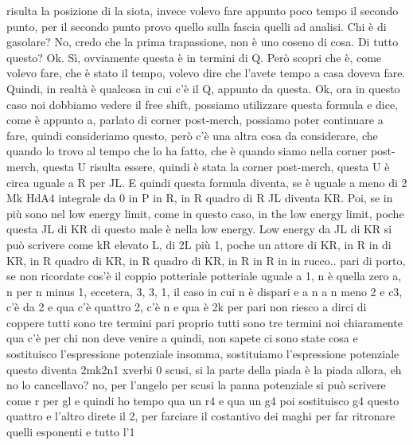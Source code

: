 \begin{soluzione}
risulta la posizione di la siota, invece volevo fare appunto poco tempo il secondo punto, per il secondo punto provo quello sulla fascia quelli ad analisi. Chi è di gasolare? No, credo che la prima trapassione, non è uno coseno di cosa. Di tutto questo? Ok. Sì, ovviamente questa è in termini di Q. Però scopri che è, come volevo fare, che è stato il tempo, volevo dire che l'avete tempo a casa doveva fare. Quindi, in realtà è qualcosa in cui c'è il Q, appunto da questa. Ok, ora in questo caso noi dobbiamo vedere il free shift, possiamo utilizzare questa formula e dice, come è appunto a, parlato di corner post-merch, possiamo poter continuare a fare, quindi consideriamo questo, però c'è una altra cosa da considerare, che quando lo trovo al tempo che lo ha fatto, che è quando siamo nella corner post-merch, questa U risulta essere, quindi è stata la corner post-merch, questa U è circa uguale a R per JL. E quindi questa formula diventa, se è uguale a meno di 2 Mk HdA4 integrale da 0 in P in R, in R quadro di R JL diventa KR. Poi, se in più sono nel low energy limit, come in questo caso, in the low energy limit, poche questa JL di KR di questo male è nella low energy. Low energy da JL di KR si può scrivere come kR elevato L, di 2L più 1, poche un attore di KR, in R in di KR, in R quadro di KR, in R quadro di KR, in R in R in in rucco.. pari di porto, se non ricordate cos'è il coppio potteriale potteriale uguale a 1, n è quella zero a, n per n minus 1, eccetera, 3, 3, 1, il caso in cui n è dispari e a n a n meno 2 e c3, c'è da 2 e qua c'è quattro 2, c'è n e qua è 2k per pari non riesco a dirci di coppere tutti sono tre termini pari proprio tutti sono tre termini noi chiaramente qua c'è per chi non deve venire a quindi, non sapete ci sono state cosa e sostituisco l'espressione potenziale insomma, sostituiamo l'espressione potenziale questo diventa 2mk2n1 xverbi 0 scusi, si la parte della piada è la piada allora, eh no lo cancellavo? no, per l'angelo per scusi la panna potenziale si può scrivere come r per gl e quindi ho tempo qua un r4 e qua un g4 poi sostituisco g4 questo quattro e l'altro direte il 2, per farciare il costantivo dei maghi per far ritronare quelli esponenti e tutto l'1
   

\end{soluzione}
